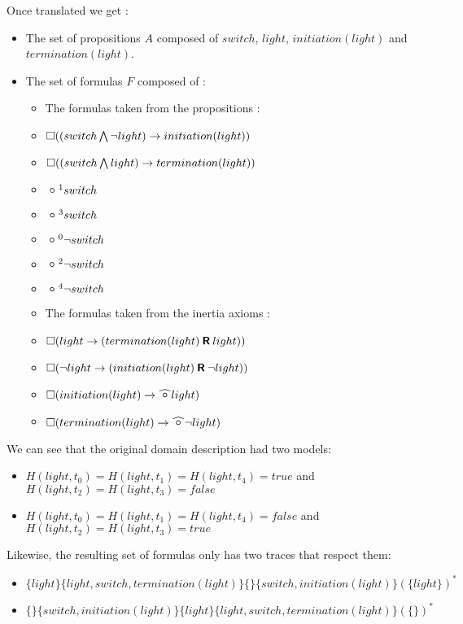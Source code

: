 Once translated we get :
\begin{itemize}
  \item The set of propositions $A$ composed of $switch$, $light$, $initiation(light)$ and $termination(light)$.
  \item The set of formulas $F$ composed of :
  \begin{itemize}
    \item The formulas taken from the propositions :
    \item $\square((switch\bigwedge \neg light)\rightarrow initiation(light))$
    \item $\square((switch\bigwedge light)\rightarrow termination(light))$
    \item $\next^{1}switch$
    \item $\next^{3}switch$
    \item $\next^{0}\neg switch$
    \item $\next^{2}\neg switch$
    \item $\next^{4}\neg switch$
    \item The formulas taken from the inertia axioms :
    \item $\square(light\rightarrow (termination(light) \mathbin{\bm{\mathsf{R}}} light))$
    \item $\square(\neg light\rightarrow (initiation(light) \mathbin{\bm{\mathsf{R}}} \neg light))$
    \item $\alwaysF(initiation(light)\rightarrow\wnext light)$
    \item $\alwaysF(termination(light)\rightarrow\wnext \neg light)$
  \end{itemize}
\end{itemize}

We can see that the original domain description had two models:
\begin{itemize}
  \item $H(light,t_0)=H(light,t_1)=H(light,t_4)=true$ and $H(light,t_2)=H(light,t_3)=false$
  \item $H(light,t_0)=H(light,t_1)=H(light,t_4)=false$ and $H(light,t_2)=H(light,t_3)=true$
\end{itemize}

Likewise, the resulting set of formulas only has two traces that respect them:
\begin{itemize}
  \item $\{light\}\{light,switch,termination(light)\}\{\}\{switch,initiation(light)\}(\{light\})^*$
  \item $\{\}\{switch,initiation(light)\}\{light\}\{light,switch,termination(light)\}(\{\})^*$
\end{itemize}
